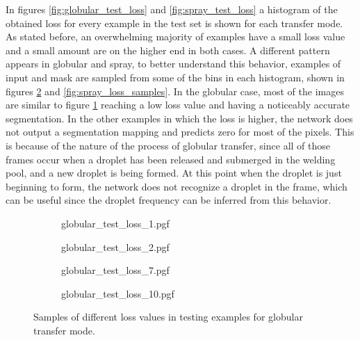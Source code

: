 In figures \ref{fig:globular_test_loss} and \ref{fig:spray_test_loss} a histogram of the obtained loss for every example in the test set is shown for each transfer mode. As stated before, an overwhelming majority of examples have a small loss value and a small amount are on the higher end in both cases. A different pattern appears in globular and spray, to better understand this behavior, examples of input and mask are sampled from some of the bins in each histogram, shown in figures \ref{fig:globular_loss_samples} and \ref{fig:spray_loss_samples}. In the globular case, most of the images are similar to figure \ref{fig:globular_loss_samples_a} reaching a low loss value and having a noticeably accurate segmentation. In the other examples in which the loss is higher, the network does not output a segmentation mapping and predicts zero for most of the pixels. This is because of the nature of the process of globular transfer, since all of those frames occur when a droplet has been released and submerged in the welding pool, and a new droplet is being formed. At this point when the droplet is just beginning to form, the network does not recognize a droplet in the frame, which can be useful since the droplet frequency can be inferred from this behavior.

\begin{figure}
  \begin{subfigure}[b]{0.45\textwidth}
    {globular_test_loss_1.pgf}
    \caption{}
    \label{fig:globular_loss_samples_a}
  \end{subfigure}
\hfill
  \begin{subfigure}[b]{0.45\textwidth}
    {globular_test_loss_2.pgf}
    \caption{}
  \end{subfigure}
 \vfill
  \begin{subfigure}[b]{0.45\textwidth}
    {globular_test_loss_7.pgf}
    \caption{}
  \end{subfigure}
\hfill
  \begin{subfigure}[b]{0.45\textwidth}
    {globular_test_loss_10.pgf}
    \caption{}
  \end{subfigure}
  \caption[Samples of different loss values in testing examples for globular transfer mode]{Samples of different loss values in testing examples for globular transfer mode.}
  \label{fig:globular_loss_samples}
\end{figure}

